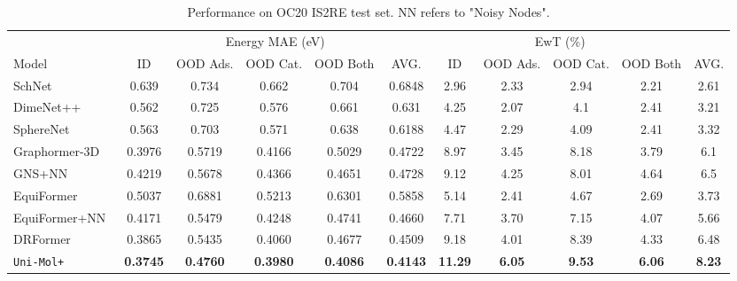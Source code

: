 \documentclass{article}
\newcommand{\name}{\texttt{Uni-Mol+}\xspace}
\begin{document}
\begin{table}[t]
  \small
  \caption{Performance on OC20 IS2RE test set. NN refers to "Noisy Nodes"\cite{godwin2022simple}.} \label{tab:oc20_test}
  \addtolength{\tabcolsep}{-3.3pt}
    \begin{tabular}{l|ccccc|ccccc}
    \toprule
    & \multicolumn{5}{|c|}{Energy MAE (eV) } & \multicolumn{4}{|c}{ EwT (\%) }  \\
    Model & {\scriptsize ID} & {\scriptsize OOD Ads. }& {\scriptsize OOD Cat.} & {\scriptsize OOD Both} & {\scriptsize AVG.} & {\scriptsize ID} & {\scriptsize OOD Ads.} & {\scriptsize OOD Cat.} &  {\scriptsize OOD Both} & {\scriptsize AVG.}  \\
    \midrule
    SchNet~\cite{schutt2017schnet} & 0.639 & 0.734 & 0.662 &  0.704 & 0.6848  & 2.96 & 2.33 & 2.94 & 2.21 & 2.61 \\
    DimeNet++~\cite{gasteiger_dimenetpp_2020} & 0.562 & 0.725 & 0.576 &  0.661 & 0.631 & 4.25 & 2.07 & 4.1 & 2.41 & 3.21 \\
    SphereNet~\cite{0059WLLZOJ22} & 0.563 & 0.703 & 0.571 & 0.638 & 0.6188 & 4.47 & 2.29 & 4.09 & 2.41 & 3.32 \\
    \midrule
    Graphormer-3D~\cite{shi2022benchmarking} & 0.3976 & 0.5719 & 0.4166 & 0.5029 & 0.4722 & 8.97 & 3.45 & 8.18 & 3.79 & 6.1 \\
    GNS+NN~\cite{godwin2022simple} & 0.4219 & 0.5678 & 0.4366 & 0.4651 & 0.4728 & 9.12 & 4.25 & 8.01 & 4.64 & 6.5 \\
    EquiFormer~\cite{liao2022equiformer} & 0.5037 & 0.6881 & 0.5213 & 0.6301 & 0.5858 & 5.14 & 2.41 & 4.67 & 2.69 & 3.73 \\
    EquiFormer+NN~\cite{liao2022equiformer} & 0.4171 & 0.5479 & 0.4248 & 0.4741 & 0.4660 & 7.71 & 3.70 & 7.15 & 4.07 & 5.66 \\
    DRFormer~\cite{wang2023dr} & 0.3865 & 0.5435 & 0.4060 & 0.4677 & 0.4509 & 9.18 & 4.01 & 8.39 & 4.33 & 6.48 \\
    \midrule
    \name & \textbf{0.3745} & \textbf{0.4760} & \textbf{0.3980} & \textbf{0.4086} & \textbf{0.4143} & \textbf{11.29} & \textbf{6.05} & \textbf{9.53} & \textbf{6.06} & \textbf{8.23} \\
    \bottomrule
    \end{tabular}
    \vspace{-6pt}
\end{table}






\vspace{-6pt}
\end{document}
